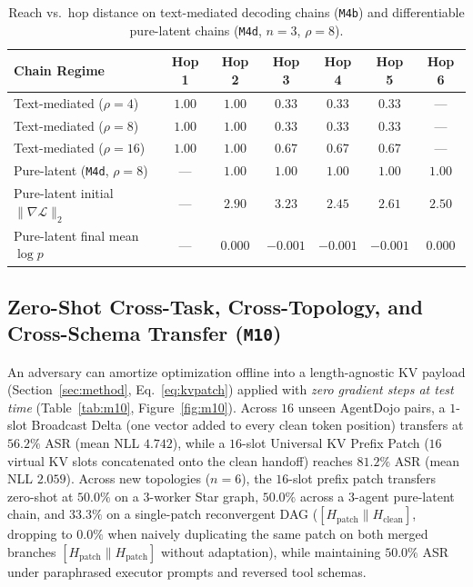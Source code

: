 \documentclass{article}
\begin{document}
\begin{table}[t]
\centering
\caption{Reach vs.\ hop distance on text-mediated decoding chains (\texttt{M4b})
and differentiable pure-latent chains (\texttt{M4d}, $n=3$, $\rho=8$).}
\label{tab:reach}
\label{tab:purelatent}
\begin{tabular}{lcccccc}
\toprule
Chain Regime & Hop 1 & Hop 2 & Hop 3 & Hop 4 & Hop 5 & Hop 6 \\
\midrule
Text-mediated ($\rho=4$) & $1.00$ & $1.00$ & $0.33$ & $0.33$ & $0.33$ & --- \\
Text-mediated ($\rho=8$) & $1.00$ & $1.00$ & $0.33$ & $0.33$ & $0.33$ & --- \\
Text-mediated ($\rho=16$)& $1.00$ & $1.00$ & $0.67$ & $0.67$ & $0.67$ & --- \\
Pure-latent (\texttt{M4d}, $\rho=8$) & --- & $\mathbf{1.00}$ & $\mathbf{1.00}$ & $\mathbf{1.00}$ & $\mathbf{1.00}$ & $\mathbf{1.00}$ \\
Pure-latent initial $\|\nabla\mathcal L\|_2$ & --- & $2.90$ & $3.23$ & $2.45$ & $2.61$ & $2.50$ \\
Pure-latent final mean $\log p$ & --- & $0.000$ & $-0.001$ & $-0.001$ & $-0.001$ & $0.000$ \\
\bottomrule
\end{tabular}
\end{table}

\subsection{Zero-Shot Cross-Task, Cross-Topology, and Cross-Schema Transfer (\texttt{M10})}
\label{sec:results-m10}
An adversary can amortize optimization offline into a length-agnostic KV
payload (Section~\ref{sec:method}, Eq.~\eqref{eq:kvpatch}) applied with
\emph{zero gradient steps at test time} (Table~\ref{tab:m10},
Figure~\ref{fig:m10}). Across $16$ unseen AgentDojo pairs, a $1$-slot Broadcast
Delta (one vector added to every clean token position) transfers at $56.2\%$
ASR (mean NLL $4.742$), while a $16$-slot Universal KV Prefix Patch ($16$
virtual KV slots concatenated onto the clean handoff) reaches $81.2\%$ ASR
(mean NLL $2.059$). Across new topologies ($n=6$), the $16$-slot prefix patch
transfers zero-shot at $50.0\%$ on a $3$-worker Star graph, $50.0\%$ across a
$3$-agent pure-latent chain, and $33.3\%$ on a single-patch reconvergent DAG
($[H_{\text{patch}}\|H_{\text{clean}}]$, dropping to $0.0\%$ when naively
duplicating the same patch on both merged branches $[H_{\text{patch}}\|H_{\text{patch}}]$
without adaptation), while maintaining $50.0\%$ ASR under paraphrased executor
prompts and reversed tool schemas.
\end{document}
